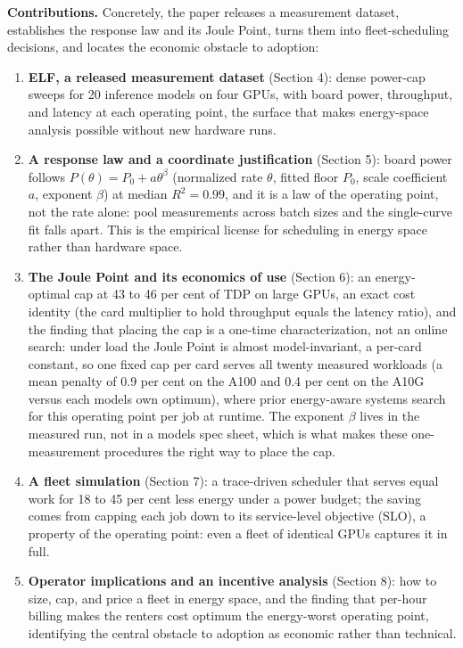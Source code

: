 \textbf{Contributions.} Concretely, the paper releases a measurement dataset, establishes the response law and
its Joule Point, turns them into fleet-scheduling decisions, and locates the economic obstacle to adoption:

\begin{enumerate}
\tightlist
\item
  \textbf{ELF, a released measurement dataset} (Section 4): dense power-cap sweeps for 20 inference models on
  four GPUs, with board power, throughput, and latency at each operating point, the surface that makes
  energy-space analysis possible without new hardware runs.
\item
  \textbf{A response law and a coordinate justification} (Section 5): board power follows
  {\(P(\theta)=P_0+a\theta^{\beta}\)} (normalized rate {\(\theta\)}, fitted floor {\(P_0\)}, scale coefficient {\(a\)}, exponent {\(\beta\)}) at median {\(R^2=0.99\)}, and it is a law of
  the operating point, not the rate alone: pool measurements across batch sizes and the single-curve fit falls
  apart. This is the empirical license for
  scheduling in energy space rather than hardware space.
\item
  \textbf{The Joule Point and its economics of use} (Section 6): an energy-optimal cap at 43 to
  46 per cent of TDP on large GPUs, an exact cost identity (the card multiplier to hold throughput
  equals the latency ratio), and the finding that placing the cap is a one-time characterization, not an online
  search: under load the Joule Point is almost model-invariant, a per-card constant, so one fixed cap per card
  serves all twenty measured workloads (a mean penalty of 0.9 per cent on the A100 and
  0.4 per cent on the A10G versus each model\textquotesingle s own optimum), where prior energy-aware systems
  search for this operating point per job at runtime. The exponent {\(\beta\)} lives in the measured run, not in a
  model\textquotesingle s spec sheet, which is what makes these one-measurement procedures the right way to place the
  cap.
\item
  \textbf{A fleet simulation} (Section 7): a trace-driven scheduler that serves equal work for 18 to
  45 per cent less energy under a power budget; the saving comes from capping each job down to its
  service-level objective (SLO), a property of the operating point: even a fleet of identical GPUs captures it in
  full.
\item
  \textbf{Operator implications and an incentive analysis} (Section 8): how to size, cap, and price a fleet in
  energy space, and the finding that per-hour billing makes the renter\textquotesingle s cost optimum the energy-worst operating
  point, identifying the central obstacle to adoption as economic rather than technical.
\end{enumerate}

